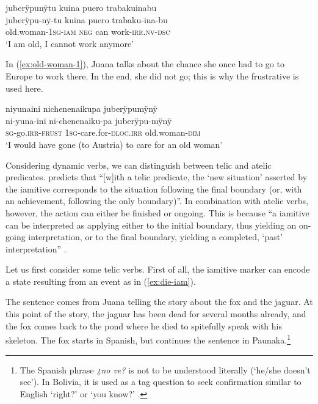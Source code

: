 \ea\label{ex:old-woman-2}
\begingl 
\glpreamble juberÿpunÿtu kuina puero trabakuinabu\\
\gla juberÿpu-nÿ-tu kuina puero trabaku-ina-bu\\ 
\glb old.woman-1\textsc{sg}-\textsc{iam} \textsc{neg} can work-\textsc{irr.nv}-\textsc{dsc}\\ 
\glft ‘I am old, I cannot work anymore’\\ 
\endgl
\trailingcitation{[uxx-p110825l.203]}
\xe

In (\ref{ex:old-woman-1}), Juana talks about the chance she once had to go to Europe to work there. In the end, she did not go; this is why the frustrative is used here.

\ea\label{ex:old-woman-1}
\begingl 
\glpreamble niyunaini nichenenaikupa juberÿpumÿnÿ\\
\gla ni-yuna-ini ni-chenenaiku-pa juberÿpu-mÿnÿ\\ 
\textsc{sg}-go.\textsc{irr}-\textsc{frust} 1\textsc{sg}-care.for-\textsc{dloc.irr} old.woman-\textsc{dim}\\ 
\glft ‘I would have gone (to Austria) to care for an old woman’\\ 
\endgl
\trailingcitation{[jxx-e120516l-1.015]}
\xe


Considering dynamic verbs, we can distinguish between telic and atelic predicates. \citet[19]{Olsson2013} predicts that “[w]ith a telic predicate, the ‘new situation’ asserted by the iamitive corresponds to the situation following the final boundary (or, with an achievement, following the only boundary)”. In combination with atelic verbs, however, the action can either be finished or ongoing. This is because “a iamitive can be interpreted as applying either to the initial boundary, thus yielding an on-going interpretation, or to the final boundary, yielding a completed, ‘past’ interpretation” \citep[19]{Olsson2013}. 

Let us first consider some telic verbs. First of all, the iamitive marker can encode a state resulting from an event as in (\ref{ex:die-iam}).

The sentence comes from Juana telling the story about the fox and the jaguar. At this point of the story, the jaguar has been dead for several months already, and the fox comes back to the pond where he died to spitefully speak with his skeleton. The fox starts in Spanish, but continues the sentence in Paunaka.\footnote{The Spanish phrase \textit{¿no ve?} is not to be understood literally (‘he/she doesn’t see’). In Bolivia, it is used as a tag question to seek confirmation similar to English ‘right?’ or ‘you know?’ \citep[45]{Mendoza2015}.}

